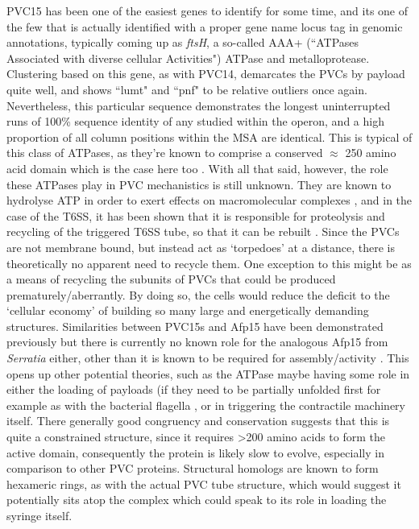 PVC15 has been one of the easiest genes to identify for some time, and its one of the few that is actually identified with a proper gene name locus tag in genomic annotations, typically coming up as \emph{ftsH}, a so-called AAA+ (``ATPases Associated with diverse cellular Activities") ATPase and metalloprotease. Clustering based on this gene, as with PVC14, demarcates the PVCs by payload quite well, and shows ``lumt" and ``pnf" to be relative outliers once again. Nevertheless, this particular sequence demonstrates the longest uninterrupted runs of 100\% sequence identity of any studied within the operon, and a high proportion of all column positions within the MSA are identical. This is typical of this class of ATPases, as they're known to comprise a conserved $\approx$ 250 amino acid domain which is the case here too \citep{Hanson2005}. With all that said, however, the role these ATPases play in PVC mechanistics is still unknown. They are known to hydrolyse ATP in order to exert effects on macromolecular complexes \citep{Erzberger2006}, and in the case of the T6SS, it has been shown that it is responsible for proteolysis and recycling of the triggered T6SS tube, so that it can be rebuilt \citep{Bonemann2009, Forster2014}. Since the PVCs are not membrane bound, but instead act as `torpedoes' at a distance, there is theoretically no apparent need to recycle them. One exception to this might be as a means of recycling the subunits of PVCs that could be produced prematurely/aberrantly. By doing so, the cells would reduce the deficit to the `cellular economy' of building so many large and energetically demanding structures. Similarities between PVC15s and Afp15 have been demonstrated previously but there is currently no known role for the analogous Afp15 from \emph{Serratia} either, other than it is known to be required for assembly/activity \citep{Hurst2004, Hurst2018}. This opens up other potential theories, such as the ATPase maybe having some role in either the loading of payloads (if they need to be partially unfolded first for example as with the bacterial flagella \citep{Muskotal2006}, or in triggering the contractile machinery itself. There generally good congruency and conservation suggests that this is quite a constrained structure, since it requires \textgreater 200 amino acids to form the active domain, consequently the protein is likely slow to evolve, especially in comparison to other PVC proteins. Structural homologs are known to form hexameric rings, as with the actual PVC tube structure, which would suggest it potentially sits atop the complex which could speak to its role in loading the syringe itself.

